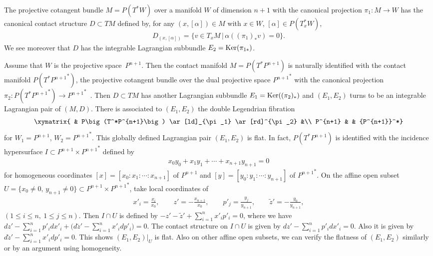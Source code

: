 \documentclass[pdftex]{sigma}
\begin{document}
\begin{Ex}
The projective cotangent bundle
$M = P(T^*W)$ over a manifold $W$ of dimension $n+1$
with the canonical projection $\pi_1 \colon M \to W$
has the canonical contact structure $D \subset TM$
def\/ined by, for any $(x, [\alpha]) \in M$ with $x \in W$, $[\alpha] \in P(T^*_xW)$,
\begin{gather*}
D_{(x, [\alpha])} = \{ v \in T_xM \,|\, \alpha((\pi_1)_* v) = 0 \}.
\end{gather*}
We see moreover that $D$ has the integrable Lagrangian subbundle
$E_2 = {\rm Ker}(\pi_{1*})$.

Assume that $W$ is the projective space~$P^{n+1}$.
Then the contact manifold
$M=P(T^*P^{n+1})$ is naturally identif\/ied with the contact manifold
$P(T^*{P^{n+1}}^*)$, the projective cotangent bundle over
the dual projective space ${P^{n+1}}^*$ with
the canonical projection $\pi_2 \colon P(T^*{P^{n+1}}^*)
\to {P^{n+1}}^*$~\cite{I-Mo}.
Then $D \subset TM$ has another Lagrangian subbundle
$E_1 = {\rm Ker}((\pi_2)_*)$ and $(E_1, E_2)$ turns to be an
integrable Lagrangian pair of $(M, D)$.
There is associated to $(E_1, E_2)$ the double Legendrian f\/ibration
\begin{gather*}
\xymatrix{
& P\big(T^*P^{n+1}\big) \ar[ld]_{\pi_1} \ar[rd]^{\pi_2}  &\\
P^{n+1} &  & {P^{n+1}}^*}
\end{gather*}
for $W_1=P^{n+1}$, $W_2= {P^{n+1}}^*$.
This globally def\/ined Lagrangian pair $(E_1, E_2)$ is f\/lat.
In fact, $P(T^*P^{n+1})$ is identif\/ied with
the incidence hypersurface $I \subset P^{n+1}\times {P^{n+1}}^*$ def\/ined
by
\begin{gather*}
x_0y_0 + x_1y_1 + \cdots + x_{n+1}y_{n+1} = 0
\end{gather*}
for homogeneous coordinates $[x] = [x_0 : x_1 : \cdots : x_{n+1}]$
of $P^{n+1}$ and
$[y] = [y_0 : y_1 : \cdots : y_{n+1}]$
of ${P^{n+1}}^*$. On the af\/f\/ine open subset $U =
\{ x_0 \not= 0, \, y_{n+1}\not= 0\} \subset P^{n+1}\times {P^{n+1}}^*$,
take local coordinates of
\begin{gather*}
x'_i = \frac{x_i}{x_0},
\qquad
z' = - \frac{x_{n+1}}{x_0},
\qquad
p'_j = \frac{y_j}{y_{n+1}},
\qquad
\tilde{z}' = - \frac{y_0}{y_{n+1}},
\end{gather*}
$(1 \leq i \leq n,\ 1 \leq j \leq n)$.
Then $I \cap U$ is def\/ined by
$- z' - \tilde{z}' + \sum\limits_{i=1}^n x'_ip'_i = 0$, where we have
$dz' - \sum\limits_{i=1}^n p'_i dx'_i + \Big(d\tilde{z}' - \sum\limits_{i=1}^n x'_i dp'_i\Big) = 0$.
The contact structure on $I \cap U$ is given by
$dz' - \sum\limits_{i=1}^n p'_i dx'_i = 0$.
Also it is given by $d\tilde{z}' - \sum\limits_{i=1}^n x'_i dp'_i = 0$.
This shows $(E_1, E_2)\vert_{U}$ is f\/lat. Also on other af\/f\/ine open subsets,
we can verify the f\/latness of $(E_1, E_2)$ similarly or by
an argument using homogeneity.
\end{Ex}
\end{document}

